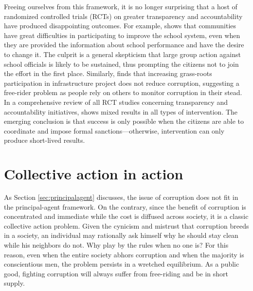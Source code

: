 \documentclass[12pt]{article}
\begin{document}
Freeing ourselves from this framework, it is no longer surprising that a host of randomized controlled trials (RCTs) on greater transparency and accountability have produced disappointing outcomes. For example, \citet{Banerjee2010} shows that communities have great difficulties in participating to improve the school system, even when they are provided the information about school performance and have the desire to change it. The culprit is a general skepticism that large group action against school officials is likely to be sustained, thus prompting the citizens not to join the effort in the first place. Similarly, \citet{Olken2005} finds that increasing grass-roots participation in infrastructure project does not reduce corruption, suggesting a free-rider problem as people rely on others to monitor corruption in their stead. In a comprehensive review of all RCT studies concerning transparency and accountability initiatives, \citet{Joshi2010a} shows mixed results in all types of intervention. The emerging conclusion is that success is only possible when the citizens are able to coordinate and impose formal sanctions---otherwise, intervention can only produce short-lived results.

\section{Collective action in action} \label{sec:collectiveaction}

As Section \ref{sec:principalagent} discusses, the issue of corruption does not fit in the principal-agent framework. On the contrary, since the benefit of corruption is concentrated and immediate while the cost is diffused across society, it is a classic collective action problem. Given the cynicism and mistrust that corruption breeds in a society, an individual may rationally ask himself why he should stay clean while his neighbors do not. Why play by the rules when no one is? For this reason, even when the entire society abhors corruption and when the majority is conscientious men, the problem persists in a wretched equilibrium. As a public good, fighting corruption will always suffer from free-riding and be in short supply.
\end{document}
